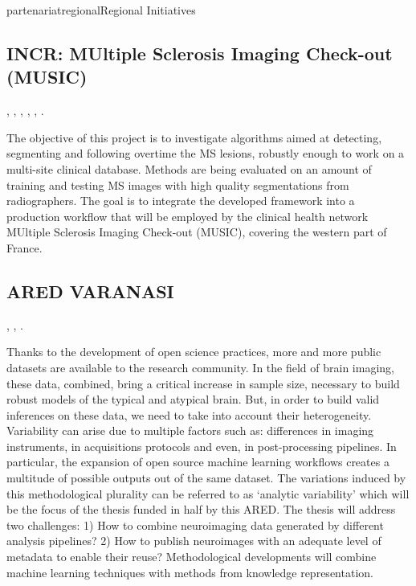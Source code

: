 \documentclass{ra2018}
\begin{document}
\begin{module}{partenariat}{regional}{Regional Initiatives}

\subsection{INCR: MUltiple Sclerosis Imaging Check-out (MUSIC)}
    \begin{participants}
      ,
      ,
      ,
      ,
      ,
      .
    \end{participants}
The objective of this project is to investigate algorithms aimed at detecting, segmenting and following overtime the MS lesions, robustly enough to work on a multi-site clinical database. Methods are being evaluated on an amount of training and testing MS images with high quality segmentations from radiographers.
The goal is to integrate the developed framework into a production workflow that will be employed by the clinical health network MUltiple Sclerosis Imaging Check-out (MUSIC), covering the western part of France.

\subsection{ARED VARANASI}
    \begin{participants}
      ,
      ,
      .
    \end{participants}
Thanks to the development of open science practices, more and more public datasets are available to the research community. In the field of brain imaging, these data, combined, bring a critical increase in sample size, necessary to build robust models of the typical and atypical brain.
But, in order to build valid inferences on these data, we need to take into account their heterogeneity. Variability can arise due to multiple factors such as: differences in imaging instruments, in acquisitions protocols and even, in post-processing pipelines. In particular, the expansion of open source machine learning workflows creates a multitude of possible outputs out of the same dataset. The variations induced by this methodological plurality can be referred to as ‘analytic variability’ which will be the focus of the thesis funded in half by this ARED.
The thesis will address two challenges: 1) How to combine neuroimaging data generated by different analysis pipelines? 2) How to publish neuroimages with an adequate level of metadata to enable their reuse? Methodological developments will combine machine learning techniques with methods from knowledge representation. 

\end{module}
\end{document}
